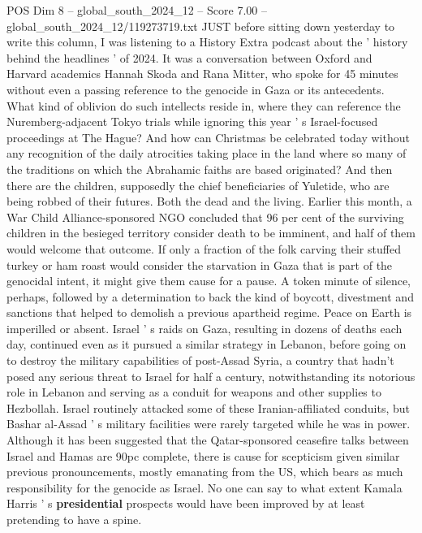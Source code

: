 \begin{textsample}{POS Dim 8 – global\_south\_2024\_12 – Score 7.00 – global\_south\_2024\_12/119273719.txt}  \label{ex:f8_pos_353}
JUST before sitting down yesterday to write this column, I was listening to a History Extra podcast about the ' history behind the headlines ' of 2024.
It was a conversation between Oxford and Harvard academics Hannah Skoda and Rana Mitter, who spoke for 45 minutes without even a passing reference to the genocide in Gaza or its antecedents.
What kind of oblivion do such intellects reside in, where they can reference the Nuremberg-adjacent Tokyo trials while ignoring this year ' s Israel-focused proceedings at The Hague?
And how can Christmas be celebrated today without any recognition of the daily atrocities taking place in the land where so many of the traditions on which the Abrahamic faiths are based originated?
And then there are the children, supposedly the chief beneficiaries of Yuletide, who are being robbed of their futures.
Both the dead and the living.
Earlier this month, a War Child Alliance-sponsored NGO concluded that 96 per cent of the surviving children in the besieged territory consider death to be imminent, and half of them would welcome that outcome.
If only a fraction of the folk carving their stuffed turkey or ham roast would consider the starvation in Gaza that is part of the genocidal intent, it might give them cause for a pause.
A token minute of silence, perhaps, followed by a determination to back the kind of boycott, divestment and sanctions that helped to demolish a previous apartheid regime.
Peace on Earth is imperilled or absent.
Israel ' s raids on Gaza, resulting in dozens of deaths each day, continued even as it pursued a similar strategy in Lebanon, before going on to destroy the military capabilities of post-Assad Syria, a country that hadn't posed any serious threat to Israel for half a century, notwithstanding its notorious role in Lebanon and serving as a conduit for weapons and other supplies to Hezbollah.
Israel routinely attacked some of these Iranian-affiliated conduits, but Bashar al-Assad ' s military facilities were rarely targeted while he was in power.
Although it has been suggested that the Qatar-sponsored ceasefire talks between Israel and Hamas are 90pc complete, there is cause for scepticism given similar previous pronouncements, mostly emanating from the US, which bears as much responsibility for the genocide as Israel.
No one can say to what extent Kamala Harris ' s \textbf{presidential} prospects would have been improved by at least pretending to have a spine.

\end{textsample}
